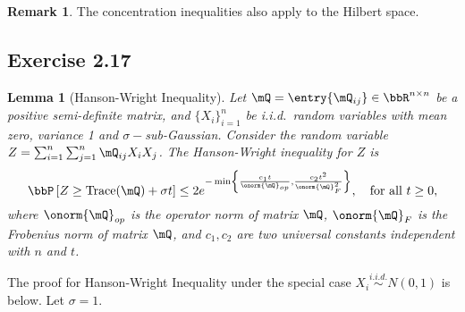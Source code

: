 \documentclass[11pt]{article}
\DeclareMathOperator{\tr}{Trace}
\newcommand{\off}[1]{\left[#1\right]}
\newcommand{\offf}[1]{\left\{#1\right\}}
\theoremstyle{plain}
\newtheorem{lem}{Lemma}
\theoremstyle{definition}
\newtheorem{rmk}{Remark}
\begin{document}
    \begin{rmk}
    	The concentration inequalities also apply to the Hilbert space. 
    \end{rmk}
    
    \subsection{Exercise 2.17}
    \begin{lem}[Hanson-Wright Inequality]
   Let $\mQ = \entry{\mQ_{ij}}  \in \bbR^{n \times n} $ be a positive semi-definite matrix, and $\{X_i\}_{i = 1}^n$ be i.i.d.\ random variables with mean zero, variance 1 and $\sigma-$sub-Gaussian. Consider the random variable $Z = \sum_{i= 1}^n \sum_{j = 1}^n \mQ_{ij} X_i X_j$. The Hanson-Wright inequality for $Z$ is
   \begin{equation}
   	\bbP \off{Z \geq \tr (\mQ) + \sigma t } \leq 2 e^{- \min \offf{\frac{c_1 t}{\onorm{\mQ}_{op}  } , \frac{c_2 t^2}{\onorm{\mQ}^2_F} }}, \quad \text{for all } t \geq 0,
   \end{equation}
   where $\onorm{\mQ}_{op}$ is the operator norm of matrix $\mQ$, $\onorm{\mQ}_F$ is the Frobenius norm of matrix $\mQ$, and $c_1,c_2$ are two universal constants independent with $n$ and $t$.
    \end{lem}
    
    The proof for Hanson-Wright Inequality under the special case  $X_i \stackrel{i.i.d.}{\sim} N(0,1)$ is below. Let $\sigma  = 1$.
    
\end{document}
